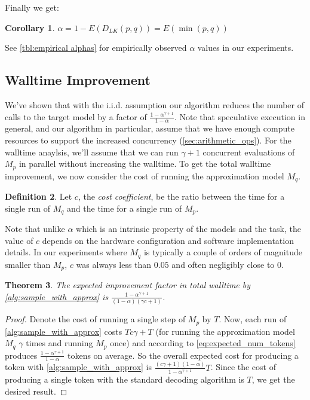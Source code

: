 \documentclass[nohyperref]{article}
\theoremstyle{plain}
\newtheorem{theorem}{Theorem}[section]
\newtheorem{corollary}[theorem]{Corollary}
\theoremstyle{definition}
\newtheorem{definition}[theorem]{Definition}
\theoremstyle{remark}
\begin{document}
Finally we get:

\begin{corollary}
\label{thm:dlk_alpha}
$\alpha = 1 - E(D_{LK}(p, q)) = E(\min(p, q))$
\end{corollary}

See \cref{tbl:empirical alphas} for empirically observed $\alpha$ values in our experiments.


\subsection{Walltime Improvement}
\label{sec:latency_imp}

We've shown that with the i.i.d. assumption our algorithm reduces the number of calls to the target model by a factor of $\frac{1 - \alpha^{\gamma + 1}}{1 - \alpha}$.
Note that speculative execution in general, and our algorithm in particular, assume that we have enough compute resources to support the increased concurrency (\cref{sec:arithmetic_ops}). For the walltime anaylsis, we'll assume that we can run $\gamma + 1$ concurrent evaluations of $M_p$ in parallel without increasing the walltime.
To get the total walltime improvement, we now consider the cost of running the approximation model $M_q$.

\begin{definition}
\label{def:c}
Let $c$, the \emph{cost coefficient}, be the ratio between the time for a single run of $M_q$ and the time for a single run of $M_p$.
\end{definition}

Note that unlike $\alpha$ which is an intrinsic property of the models and the task, the value of $c$ depends on the hardware configuration and software implementation details. In our experiments where $M_q$ is typically a couple of orders of magnitude smaller than $M_p$, $c$ was always less than $0.05$ and often negligibly close to 0.

\begin{theorem}
\label{thm:total_walltime}
The expected improvement factor in total walltime by \cref{alg:sample_with_approx} is $\frac{1 - \alpha^{\gamma + 1}}{(1-\alpha)({\gamma}c + 1)}$.

\end{theorem}
\begin{proof}
Denote the cost of running a single step of $M_p$ by $T$. Now, each run of \cref{alg:sample_with_approx} costs $Tc\gamma + T$ (for running the approximation model $M_q$ $\gamma$ times and running $M_p$ once) and according to \cref{eq:expected_num_tokens} produces $\frac{1 - \alpha^{\gamma + 1}}{1 - \alpha}$ tokens on average.
So the overall expected cost for producing a token with \cref{alg:sample_with_approx} is $\frac{(c\gamma + 1)(1-\alpha)}{1 - \alpha^{\gamma + 1}}T$.
Since the cost of producing a single token with the standard decoding algorithm is $T$, we get the desired result.
\end{proof}
\end{document}
